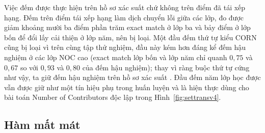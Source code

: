 \documentclass[12pt,a4paper]{article}
\begin{document}
Việc đếm được thực hiện trên hồ sơ xác suất chứ không trên điểm đã tái xếp hạng. Đếm trên điểm tái xếp hạng làm dịch chuyển lỗi giữa các lớp, đo được giảm khoảng mười ba điểm phần trăm exact match ở lớp ba và bảy điểm ở lớp bốn để đổi lấy cải thiện ở lớp năm, nên bị loại. Một đầu đếm thứ tự kiểu CORN cũng bị loại vì trên cùng tập thử nghiệm, đầu này kém hơn đáng kể đếm hậu nghiệm ở các lớp NOC cao (exact match lớp bốn và lớp năm chỉ quanh \(0{,}75\) và \(0{,}67\) so với \(0{,}93\) và \(0{,}80\) của đếm hậu nghiệm); thay vì ràng buộc thứ tự cứng như vậy, ta giữ đếm hậu nghiệm trên hồ sơ xác suất \cite{shi2023corn}. Đầu đếm năm lớp học được vẫn được giữ như một tín hiệu phụ trong huấn luyện và là hiện thực dùng cho bài toán Number of Contributors độc lập trong Hình~\ref{fig:settransv4}.

\subsection{Hàm mất mát}
\end{document}
